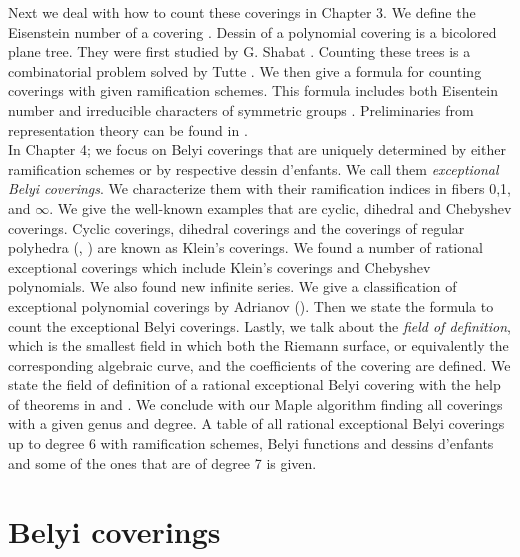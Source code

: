 Next we deal with how to count these coverings in Chapter 3. We define the Eisenstein number of a covering  \cite{LieSha}. Dessin of a polynomial covering is a bicolored plane tree. They were first studied by G. Shabat \cite{Sha}. Counting these trees is a combinatorial problem solved by Tutte \cite{Tut}. We then give a formula for counting coverings with given ramification schemes. This formula includes both Eisentein number and irreducible characters of symmetric groups \cite{KlyKur}. Preliminaries from representation theory can be found in \cite{Kurk}. \\

In Chapter 4; we focus on Belyi coverings that are uniquely determined by either ramification schemes or by respective dessin d'enfants. We call them \textit{exceptional Belyi coverings}. We characterize them with their ramification indices in fibers 0,1, and $\infty$. We give the well-known examples that are cyclic, dihedral and Chebyshev coverings. Cyclic coverings, dihedral coverings and the coverings of regular polyhedra (\cite{CouGran}, \cite{MagZvo}) are known as Klein's coverings. We found a number of rational exceptional coverings which include Klein's coverings and Chebyshev polynomials. We also found new infinite series. We give a classification of exceptional polynomial coverings by Adrianov (\cite{A09a}). Then we state the formula to count the exceptional Belyi coverings. Lastly, we talk about the \textit{field of definition}, which is the smallest field in which both the Riemann surface, or equivalently the corresponding algebraic curve, and the coefficients of the covering are defined. We state the field of definition of a rational exceptional Belyi covering with the help of theorems in \cite{Serre2}  and \cite{Serre3}. We conclude with our Maple algorithm finding all coverings with a given genus and degree. A table of all rational exceptional Belyi coverings up to degree 6 with ramification schemes, Belyi functions and dessins d'enfants and some of the ones that are of degree 7 is given. 

\section{Belyi coverings}


